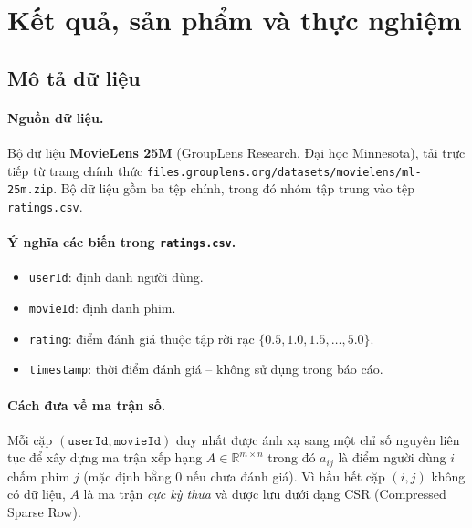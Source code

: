 \section{Kết quả, sản phẩm và thực nghiệm}

\subsection{Mô tả dữ liệu}

\paragraph{Nguồn dữ liệu.}
Bộ dữ liệu \textbf{MovieLens 25M} (GroupLens Research, Đại học Minnesota), tải
trực tiếp từ trang chính thức \texttt{files.grouplens.org/datasets/movielens/ml-25m.zip}.
Bộ dữ liệu gồm ba tệp chính, trong đó nhóm tập trung vào tệp \texttt{ratings.csv}.

\paragraph{Ý nghĩa các biến trong \texttt{ratings.csv}.}
\begin{itemize}
    \item \texttt{userId}: định danh người dùng.
    \item \texttt{movieId}: định danh phim.
    \item \texttt{rating}: điểm đánh giá thuộc tập rời rạc
    $\{0.5, 1.0, 1.5, \dots, 5.0\}$.
    \item \texttt{timestamp}: thời điểm đánh giá -- không sử dụng trong báo cáo.
\end{itemize}

\paragraph{Cách đưa về ma trận số.}
Mỗi cặp $(\texttt{userId}, \texttt{movieId})$ duy nhất được ánh xạ sang một chỉ
số nguyên liên tục để xây dựng ma trận xếp hạng
$A \in \mathbb{R}^{m\times n}$ trong đó $a_{ij}$ là điểm người dùng $i$
chấm phim $j$ (mặc định bằng $0$ nếu chưa đánh giá). Vì hầu hết cặp
$(i,j)$ không có dữ liệu, $A$ là ma trận \emph{cực kỳ thưa} và được lưu dưới
dạng CSR (Compressed Sparse Row).

